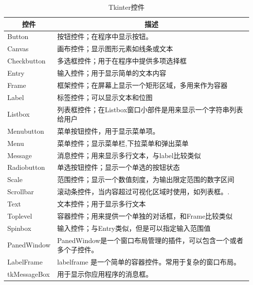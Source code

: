 \begin{table}[]
    \begin{tabular}{|l|l|}
    \hline
    \multicolumn{1}{|c|}{\textbf{控件}} & \multicolumn{1}{c|}{\textbf{描述}}       \\ \hline
    Button                              & 按钮控件；在程序中显示按钮。                         \\ \hline
    Canvas                              & 画布控件；显示图形元素如线条或文本                      \\ \hline
    Checkbutton                         & 多选框控件；用于在程序中提供多项选择框                    \\ \hline
    Entry                               & 输入控件；用于显示简单的文本内容                       \\ \hline
    Frame                               & 框架控件；在屏幕上显示一个矩形区域，多用来作为容器              \\ \hline
    Label                               & 标签控件；可以显示文本和位图                         \\ \hline
    Listbox                             & 列表框控件；在Listbox窗口小部件是用来显示一个字符串列表给用户     \\ \hline
    Menubutton                          & 菜单按钮控件，用于显示菜单项。                        \\ \hline
    Menu                                & 菜单控件；显示菜单栏,下拉菜单和弹出菜单                   \\ \hline
    Message                             & 消息控件；用来显示多行文本，与label比较类似               \\ \hline
    Radiobutton                         & 单选按钮控件；显示一个单选的按钮状态                     \\ \hline
    Scale                               & 范围控件；显示一个数值刻度，为输出限定范围的数字区间             \\ \hline
    Scrollbar                           & 滚动条控件，当内容超过可视化区域时使用，如列表框。.             \\ \hline
    Text                                & 文本控件；用于显示多行文本                          \\ \hline
    Toplevel                            & 容器控件；用来提供一个单独的对话框，和Frame比较类似           \\ \hline
    Spinbox                             & 输入控件；与Entry类似，但是可以指定输入范围值              \\ \hline
    PanedWindow                         & PanedWindow是一个窗口布局管理的插件，可以包含一个或者多个子控件。 \\ \hline
    LabelFrame                          & labelframe 是一个简单的容器控件。常用于复杂的窗口布局。      \\ \hline
    tkMessageBox                        & 用于显示你应用程序的消息框。                         \\ \hline
    \end{tabular}
    \caption{Tkinter控件}   
\end{table}

